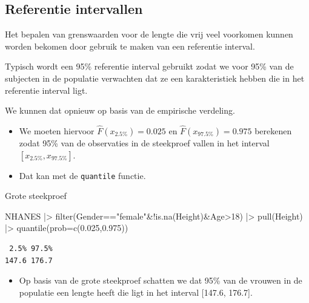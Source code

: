 \documentclass[
  dutch,
  letterpaper,
  12pt]{book}
\newenvironment{Shaded}{\begin{snugshade}}{\end{snugshade}}
\newcommand{\AttributeTok}[1]{\textcolor[rgb]{0.40,0.45,0.13}{#1}}
\newcommand{\DecValTok}[1]{\textcolor[rgb]{0.68,0.00,0.00}{#1}}
\newcommand{\FloatTok}[1]{\textcolor[rgb]{0.68,0.00,0.00}{#1}}
\newcommand{\FunctionTok}[1]{\textcolor[rgb]{0.28,0.35,0.67}{#1}}
\newcommand{\NormalTok}[1]{\textcolor[rgb]{0.00,0.23,0.31}{#1}}
\newcommand{\SpecialCharTok}[1]{\textcolor[rgb]{0.37,0.37,0.37}{#1}}
\newcommand{\StringTok}[1]{\textcolor[rgb]{0.13,0.47,0.30}{#1}}
\providecommand{\tightlist}{%
  \setlength{\itemsep}{0pt}\setlength{\parskip}{0pt}}
\theoremstyle{definition}
\theoremstyle{definition}
\theoremstyle{definition}
\theoremstyle{remark}
\begin{document}
\subsection{Referentie intervallen}\label{referentie-intervallen}

Het bepalen van grenswaarden voor de lengte die vrij veel voorkomen
kunnen worden bekomen door gebruik te maken van een referentie interval.

Typisch wordt een 95\% referentie interval gebruikt zodat we voor 95\%
van de subjecten in de populatie verwachten dat ze een karakteristiek
hebben die in het referentie interval ligt.

We kunnen dat opnieuw op basis van de empirische verdeling.

\begin{itemize}
\item
  We moeten hiervoor \(\hat{F}(x_{2.5\%})=0.025\) en
  \(\hat{F}(x_{97.5\%})=0.975\) berekenen zodat 95\% van de observaties
  in de steekproef vallen in het interval \([x_{2.5\%},x_{97.5\%}]\).
\item
  Dat kan met de \texttt{quantile} functie.
\end{itemize}

Grote steekproef

\begin{Shaded}
\begin{Highlighting}[]
\NormalTok{NHANES }\SpecialCharTok{|\textgreater{}}
  \FunctionTok{filter}\NormalTok{(Gender}\SpecialCharTok{==}\StringTok{"female"}\SpecialCharTok{\&!}\FunctionTok{is.na}\NormalTok{(Height)}\SpecialCharTok{\&}\NormalTok{Age}\SpecialCharTok{\textgreater{}}\DecValTok{18}\NormalTok{) }\SpecialCharTok{|\textgreater{}}
  \FunctionTok{pull}\NormalTok{(Height) }\SpecialCharTok{|\textgreater{}}
  \FunctionTok{quantile}\NormalTok{(}\AttributeTok{prob=}\FunctionTok{c}\NormalTok{(}\FloatTok{0.025}\NormalTok{,}\FloatTok{0.975}\NormalTok{))}
\end{Highlighting}
\end{Shaded}

\begin{verbatim}
 2.5% 97.5% 
147.6 176.7 
\end{verbatim}

\begin{itemize}
\tightlist
\item
  Op basis van de grote steekproef schatten we dat 95\% van de vrouwen
  in de populatie een lengte heeft die ligt in het interval {[}147.6,
  176.7{]}.
\end{itemize}
\end{document}

